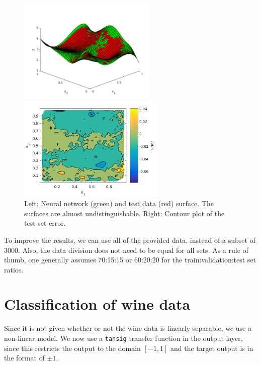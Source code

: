 \documentclass[10pt,a4paper]{article}
\begin{document}
\begin{figure}[tbh]
\centering
\begin{minipage}{0.5\textwidth}
\includegraphics[height=5cm]{figs/NN_and_testsurf.png}
\end{minipage}%
\begin{minipage}{0.5\textwidth}
\includegraphics[height=5cm]{figs/NN_test_error.png}
\end{minipage}%
\caption{Left: Neural network (green) and test data (red) surface. The surfaces are almost undistinguishable. Right: Contour plot of the test set error. \label{fig:NN_and_testsurf}}
\end{figure}

To improve the results, we can use all of the provided data, instead of a subset of $3000$. Also, the data division does not need to be equal for all sets. As a rule of thumb, one generally assumes 70:15:15 or 60:20:20 for the train:validation:test set ratios.

\section{Classification of wine data}
Since it is not given whether or not the wine data is linearly separable, we use a non-linear model. We now use a \texttt{tansig} transfer function in the output layer, since this restricts the output to the domain $[-1,1]$ and the target output is in the format of $\pm 1$.
\end{document}
